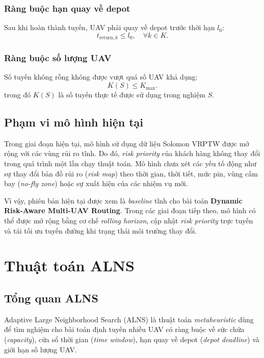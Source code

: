 \documentclass{article}
\begin{document}
\subsubsection{Ràng buộc hạn quay về depot}
Sau khi hoàn thành tuyến, UAV phải quay về depot trước thời hạn $l_0$:
\begin{equation}
    t_{\text{return}, k} \le l_0, \quad \forall k \in K.
\end{equation}

\subsubsection{Ràng buộc số lượng UAV}
Số tuyến không rỗng không được vượt quá số UAV khả dụng:
\begin{equation}
    K(S) \le K_{\max}.
\end{equation}
trong đó $K(S)$ là số tuyến thực tế được sử dụng trong nghiệm $S$.

\subsection{Phạm vi mô hình hiện tại}

Trong giai đoạn hiện tại, mô hình sử dụng dữ liệu Solomon VRPTW được mở rộng với các vùng rủi ro tĩnh. Do đó, \textit{risk priority} của khách hàng không thay đổi trong quá trình một lần chạy thuật toán. Mô hình chưa xét các yếu tố động như sự thay đổi bản đồ rủi ro (\textit{risk map}) theo thời gian, thời tiết, mức pin, vùng cấm bay (\textit{no-fly zone}) hoặc sự xuất hiện của các nhiệm vụ mới.

Vì vậy, phiên bản hiện tại được xem là \textit{baseline} tĩnh cho bài toán \textbf{Dynamic Risk-Aware Multi-UAV Routing}. Trong các giai đoạn tiếp theo, mô hình có thể được mở rộng bằng cơ chế \textit{rolling horizon}, cập nhật \textit{risk priority} trực tuyến và tái tối ưu tuyến đường khi trạng thái môi trường thay đổi.
\section{Thuật toán ALNS}

\subsection{Tổng quan ALNS}

Adaptive Large Neighborhood Search (ALNS) là thuật toán \textit{metaheuristic} dùng để tìm nghiệm cho bài toán định tuyến nhiều UAV có ràng buộc về sức chứa (\textit{capacity}), cửa sổ thời gian (\textit{time window}), hạn quay về depot (\textit{depot deadline}) và giới hạn số lượng UAV.
\end{document}

